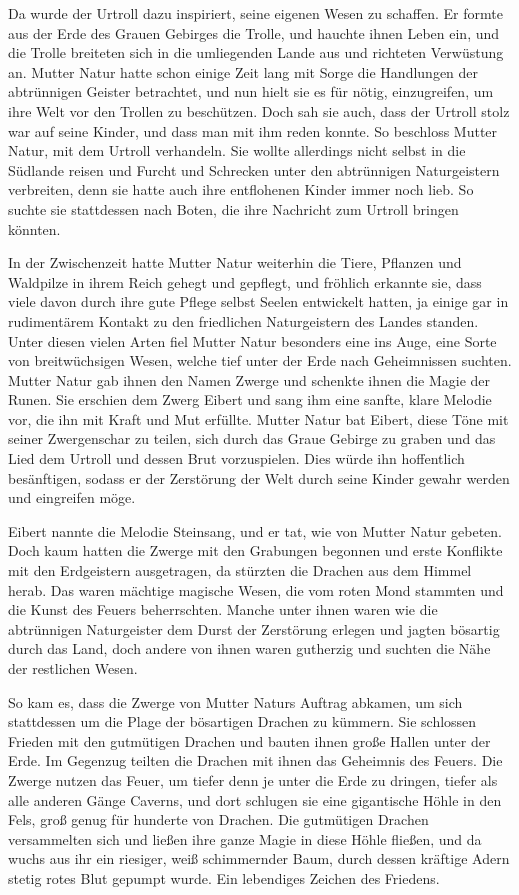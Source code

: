 Da wurde der Urtroll dazu inspiriert, seine eigenen Wesen zu schaffen. Er formte aus der Erde des Grauen Gebirges die Trolle, und hauchte ihnen Leben ein, und die Trolle breiteten sich in die umliegenden Lande aus und richteten Verwüstung an. Mutter Natur hatte schon einige Zeit lang mit Sorge die Handlungen der abtrünnigen Geister betrachtet, und nun hielt sie es für nötig, einzugreifen, um ihre Welt vor den Trollen zu beschützen. Doch sah sie auch, dass der Urtroll stolz war auf seine Kinder, und dass man mit ihm reden konnte. So beschloss Mutter Natur, mit dem Urtroll verhandeln. Sie wollte allerdings nicht selbst in die Südlande reisen und Furcht und Schrecken unter den abtrünnigen Naturgeistern verbreiten, denn sie hatte auch ihre entflohenen Kinder immer noch lieb. So suchte sie stattdessen nach Boten, die ihre Nachricht zum Urtroll bringen könnten.

In der Zwischenzeit hatte Mutter Natur weiterhin die Tiere, Pflanzen und Waldpilze in ihrem Reich gehegt und gepflegt, und fröhlich erkannte sie, dass viele davon durch ihre gute Pflege selbst Seelen entwickelt hatten, ja einige gar in rudimentärem Kontakt zu den friedlichen Naturgeistern des Landes standen. Unter diesen vielen Arten fiel Mutter Natur besonders eine ins Auge, eine Sorte von breitwüchsigen Wesen, welche tief unter der Erde nach Geheimnissen suchten. Mutter Natur gab ihnen den Namen Zwerge und schenkte ihnen die Magie der Runen. Sie erschien dem Zwerg Eibert und sang ihm eine sanfte, klare Melodie vor, die ihn mit Kraft und Mut erfüllte. Mutter Natur bat Eibert, diese Töne mit seiner Zwergenschar zu teilen, sich durch das Graue Gebirge zu graben und das Lied dem Urtroll und dessen Brut vorzuspielen. Dies würde ihn hoffentlich besänftigen, sodass er der Zerstörung der Welt durch seine Kinder gewahr werden und eingreifen möge.

Eibert nannte die Melodie Steinsang, und er tat, wie von Mutter Natur gebeten. Doch kaum hatten die Zwerge mit den Grabungen begonnen und erste Konflikte mit den Erdgeistern ausgetragen, da stürzten die Drachen aus dem Himmel herab. Das waren mächtige magische Wesen, die vom roten Mond stammten und die Kunst des Feuers beherrschten. Manche unter ihnen waren wie die abtrünnigen Naturgeister dem Durst der Zerstörung erlegen und jagten bösartig durch das Land, doch andere von ihnen waren gutherzig und suchten die Nähe der restlichen Wesen.

So kam es, dass die Zwerge von Mutter Naturs Auftrag abkamen, um sich stattdessen um die Plage der bösartigen Drachen zu kümmern. Sie schlossen Frieden mit den gutmütigen Drachen und bauten ihnen große Hallen unter der Erde. Im Gegenzug teilten die Drachen mit ihnen das Geheimnis des Feuers. Die Zwerge nutzen das Feuer, um tiefer denn je unter die Erde zu dringen, tiefer als alle anderen Gänge Caverns, und dort schlugen sie eine gigantische Höhle in den Fels, groß genug für hunderte von Drachen. Die gutmütigen Drachen versammelten sich und ließen ihre ganze Magie in diese Höhle fließen, und da wuchs aus ihr ein riesiger, weiß schimmernder Baum, durch dessen kräftige Adern stetig rotes Blut gepumpt wurde. Ein lebendiges Zeichen des Friedens.

